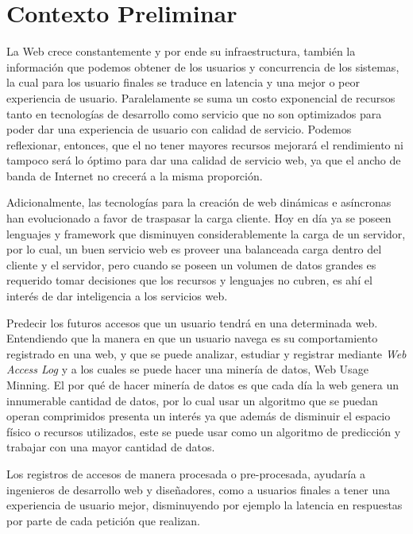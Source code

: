 \section{Contexto Preliminar} 
\label{sec:preliminar}


  La Web crece constantemente y por ende su infraestructura, también la información que podemos obtener de los  usuarios y  concurrencia de los sistemas, la cual para los usuario finales se traduce en latencia y una mejor o peor experiencia de usuario. Paralelamente se suma un costo exponencial de recursos tanto en tecnologías de desarrollo como servicio que no son optimizados para poder dar una experiencia de usuario con calidad de servicio. Podemos reflexionar, entonces, que el no tener mayores recursos mejorará el rendimiento ni tampoco será lo óptimo para dar una calidad de servicio web, ya que el ancho de banda de Internet no crecerá a la misma proporción.
   
  Adicionalmente, las tecnologías para la creación de web dinámicas e asíncronas han evolucionado a favor de traspasar la carga cliente.
  Hoy en día ya se poseen lenguajes y framework que disminuyen considerablemente la carga de un servidor, por lo cual, un buen servicio web es proveer una balanceada carga dentro del cliente y el servidor, pero cuando se poseen un volumen de datos grandes es requerido tomar decisiones que los recursos y lenguajes no cubren, es ahí el interés de dar inteligencia a los servicios web.

  Predecir los futuros accesos que un usuario tendrá en una determinada web. Entendiendo que la manera en que un usuario navega es su comportamiento registrado en una web, y que se puede analizar, estudiar y registrar mediante \emph{Web Access Log} y a los cuales se puede hacer una minería de datos, Web Usage Minning. El por qué de hacer minería de datos es que cada día la web genera un innumerable cantidad de datos, por lo cual usar un algoritmo que se puedan operan comprimidos presenta un interés ya que además de disminuir el espacio físico o recursos utilizados, este se puede usar como un algoritmo de predicción y trabajar con una mayor cantidad de datos.
  
  Los registros de accesos de manera procesada o pre-procesada, ayudaría a ingenieros de desarrollo web y diseñadores, como a  usuarios finales a tener una experiencia de usuario mejor, disminuyendo por ejemplo la latencia en respuestas por parte de cada petición que realizan.
  
